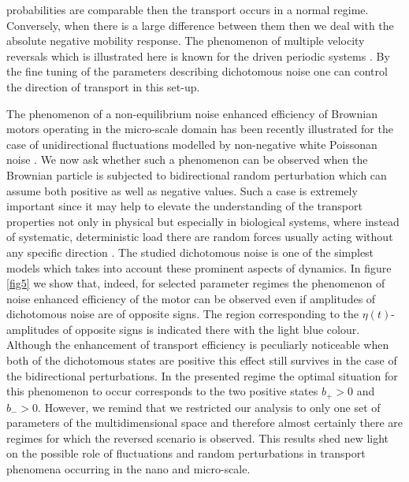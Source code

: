 \documentclass[12pt]{iopart}
\begin{document}
probabilities are comparable then the transport occurs in a normal regime. Conversely, when there is a large difference between them then we deal with the absolute negative mobility response. The phenomenon of multiple velocity reversals 
which is illustrated here is known for the driven periodic systems \cite{spiechPRB, bartussek1994, jung1996, mateos2000}. By the fine tuning of the parameters describing  dichotomous noise one can control the direction of transport in this set-up.

The phenomenon of a non-equilibrium noise enhanced efficiency of Brownian motors operating in the micro-scale domain has been recently illustrated for the case of unidirectional fluctuations modelled by non-negative white Poissonan noise 
\cite{spiechPRE}. We now ask whether such a phenomenon can be observed when the Brownian particle is subjected to bidirectional random perturbation which can assume both positive as well as negative values. Such a case is extremely important since it may help to elevate the understanding of the transport properties not only in physical but especially in biological systems, where instead of systematic, deterministic load there are random forces usually acting without any specific direction \cite{bressloff2013}. The studied dichotomous noise is one of the simplest models which takes into account these prominent aspects of dynamics. In 
figure \ref{fig5} we show that, indeed, for selected parameter regimes the phenomenon of noise enhanced efficiency of the motor can be observed even if amplitudes of dichotomous noise are of opposite signs. The region corresponding to  the $\eta(t)$-amplitudes of opposite signs is indicated there with the light blue colour. Although the enhancement of transport efficiency is peculiarly noticeable when both of the 
dichotomous states are positive this effect still survives in the case of the bidirectional perturbations. In the presented regime the optimal situation for this phenomenon to occur corresponds to the two positive states $b_+ > 0$ and $b_- > 0$. 
However, we remind that we restricted our analysis to only one set of parameters of the multidimensional space and therefore almost certainly there are regimes for which the reversed scenario is observed. This results shed new light 
on the possible role of fluctuations and random perturbations in transport phenomena occurring in the nano and micro-scale.
\end{document}
